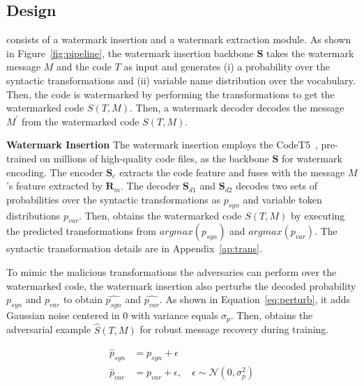 \subsection{\sys{} Design}
\sys{} consists of a watermark insertion and a watermark extraction module. As shown in Figure~\ref{fig:pipeline}, the watermark insertion backbone $\textbf{S}$ takes the watermark message $M$ and the code $T$ as input and generates (i) a probability over the syntactic transformations and (ii) variable name distribution over the vocabulary. Then, the code is watermarked by performing the transformations to get the watermarked code $S(T, M)$. Then, a watermark decoder decodes the message $M^\prime$ from the watermarked code $S(T, M)$. 


\textbf{Watermark Insertion} 
The watermark insertion employs the CodeT5~\cite{wang2021codet5}, pre-trained on millions of high-quality code files, as the backbone $\textbf{S}$ for watermark encoding. The encoder $\textbf{S}_e$ extracts the code feature and fuses with the message $M$'s feature extracted by $\textbf{R}_m$. The decoder $\mathbf{S}_{d1}$ and $\mathbf{S}_{d2}$ decodes two sets of probabilities over the syntactic transformations as $p_{syn}$ and variable token distributions $p_{var}$.  
Then, \sys{} obtains the watermarked code $S(T, M)$ by executing the predicted transformations from $argmax(p_{syn})$ and $argmax(p_{var})$. The syntactic transformation details are in Appendix~\ref{ap:trans}. 


To mimic the malicious transformations the adversaries can perform over the watermarked code, the watermark insertion also perturbs the decoded probability $p_{syn}$ and $p_{var}$ to obtain $\hat{p_{syn}}$ and $\hat{p_{var}}$. As shown in Equation~\ref{eq:perturb}, it adds Gaussian noise centered in 0 with variance equals $\sigma_p$. Then, \sys{} obtains the adversarial example $\hat{S}(T, M)$ for robust message recovery during training.  

 \vspace{-5pt}

 \begin{equation}
\label{eq:perturb}
\begin{array}{ll}
\hat{p}_{syn} &= p_{syn} + \epsilon \\
\hat{p}_{var} &= p_{var} + \epsilon, \quad \epsilon \sim \mathcal{N}(0, \sigma_p^2)
 \end{array}
\end{equation}
 \vspace{-5pt}

